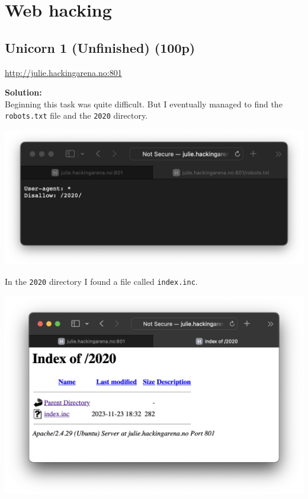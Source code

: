 \section{Web hacking}

\subsection{Unicorn 1 (Unfinished) (100p)}
\url{http://julie.hackingarena.no:801}

\textbf{Solution:}\\
Beginning this task was quite difficult. 
But I eventually managed to find the \texttt{robots.txt} file and the \texttt{2020} directory.

\begin{center}
    \includegraphics[width=15cm]{img/Web hacking/Unicorn 1/Screenshot 2023-11-24 at 22.15.51.png}
\end{center}

In the \texttt{2020} directory I found a file called \texttt{index.inc}. 

\begin{center}
    \includegraphics[width=14cm]{img/Web hacking/Unicorn 1/Screenshot 2023-11-24 at 22.17.38.png}
\end{center}

